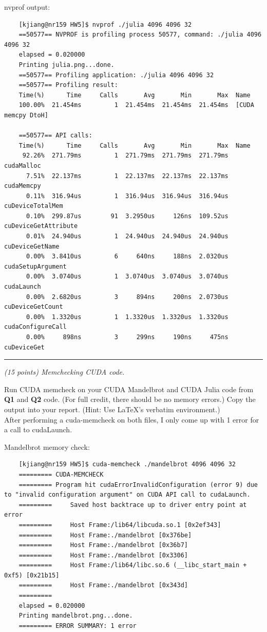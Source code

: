 \documentclass{article}
\newcommand{\myhrule}{ \begin{center}\rule{.9\linewidth}{.25mm}\end{center} }
\newcommand{\pad}{\vspace{8pt}\noindent}
\begin{document}
nvprof output:
\begin{verbatim}
    [kjiang@nr159 HW5]$ nvprof ./julia 4096 4096 32
    ==50577== NVPROF is profiling process 50577, command: ./julia 4096 4096 32
    elapsed = 0.020000
    Printing julia.png...done.
    ==50577== Profiling application: ./julia 4096 4096 32
    ==50577== Profiling result:
    Time(%)      Time     Calls       Avg       Min       Max  Name
    100.00%  21.454ms         1  21.454ms  21.454ms  21.454ms  [CUDA memcpy DtoH]
    
    ==50577== API calls:
    Time(%)      Time     Calls       Avg       Min       Max  Name
     92.26%  271.79ms         1  271.79ms  271.79ms  271.79ms  cudaMalloc
      7.51%  22.137ms         1  22.137ms  22.137ms  22.137ms  cudaMemcpy
      0.11%  316.94us         1  316.94us  316.94us  316.94us  cuDeviceTotalMem
      0.10%  299.87us        91  3.2950us     126ns  109.52us  cuDeviceGetAttribute
      0.01%  24.940us         1  24.940us  24.940us  24.940us  cuDeviceGetName
      0.00%  3.8410us         6     640ns     188ns  2.0320us  cudaSetupArgument
      0.00%  3.0740us         1  3.0740us  3.0740us  3.0740us  cudaLaunch
      0.00%  2.6820us         3     894ns     200ns  2.0730us  cuDeviceGetCount
      0.00%  1.3320us         1  1.3320us  1.3320us  1.3320us  cudaConfigureCall
      0.00%     898ns         3     299ns     190ns     475ns  cuDeviceGet
\end{verbatim}

\myhrule

\pad {\bf Q4} {\it (15 points) Memchecking CUDA code.}
\vspace{8pt} 

\noindent Run CUDA memcheck on your CUDA Mandelbrot and CUDA Julia code from \textbf{Q1} and \textbf{Q2} code. (For full credit, there should be no memory errors.) Copy the output into your report. (Hint: Use \LaTeX{}'s verbatim environment.) \\

After performing a cuda-memcheck on both files, I only come up with 1 error for a call to cudaLaunch.

Mandelbrot memory check:
\begin{verbatim}
    [kjiang@nr159 HW5]$ cuda-memcheck ./mandelbrot 4096 4096 32
    ========= CUDA-MEMCHECK
    ========= Program hit cudaErrorInvalidConfiguration (error 9) due to "invalid configuration argument" on CUDA API call to cudaLaunch. 
    =========     Saved host backtrace up to driver entry point at error
    =========     Host Frame:/lib64/libcuda.so.1 [0x2ef343]
    =========     Host Frame:./mandelbrot [0x376be]
    =========     Host Frame:./mandelbrot [0x36b7]
    =========     Host Frame:./mandelbrot [0x3306]
    =========     Host Frame:/lib64/libc.so.6 (__libc_start_main + 0xf5) [0x21b15]
    =========     Host Frame:./mandelbrot [0x343d]
    =========
    elapsed = 0.020000
    Printing mandelbrot.png...done.
    ========= ERROR SUMMARY: 1 error
\end{verbatim}
\end{document}
